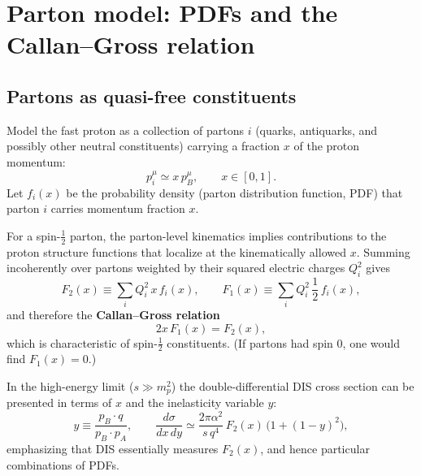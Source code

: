 \section{Parton model: PDFs and the Callan--Gross relation}
\subsection{Partons as quasi-free constituents}
Model the fast proton as a collection of partons $i$ (quarks, antiquarks, and possibly
other neutral constituents) carrying a fraction $x$ of the proton momentum:
\begin{equation}
p_i^\mu \simeq x\,p_B^\mu,\qquad x\in[0,1].
\end{equation}
Let $f_i(x)$ be the probability density (parton distribution function, PDF) that parton $i$
carries momentum fraction $x$.

For a spin-$\tfrac12$ parton, the parton-level kinematics implies contributions to the
proton structure functions that localize at the kinematically allowed $x$.
Summing incoherently over partons weighted by their squared electric charges $Q_i^2$ gives
\begin{equation}
F_2(x)\equiv \sum_i Q_i^2\,x\,f_i(x),
\qquad
F_1(x)\equiv \sum_i Q_i^2\,\frac12\,f_i(x),
\end{equation}
and therefore the \textbf{Callan--Gross relation}
\begin{equation}
\boxed{2x\,F_1(x)=F_2(x),}
\end{equation}
which is characteristic of spin-$\tfrac12$ constituents.
(If partons had spin $0$, one would find $F_1(x)=0$.)

In the high-energy limit ($s\gg m_p^2$) the double-differential DIS cross section can be
presented in terms of $x$ and the inelasticity variable $y$:
\begin{equation}
y \equiv \frac{p_B\cdot q}{p_B\cdot p_A},
\qquad
\frac{d\sigma}{dx\,dy}
\simeq \frac{2\pi\alpha^2}{s\,q^4}\,F_2(x)\,\bigl(1+(1-y)^2\bigr),
\end{equation}
emphasizing that DIS essentially measures $F_2(x)$, and hence particular combinations
of PDFs.

